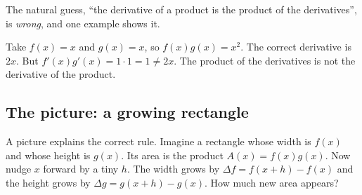 The natural guess, ``the derivative of a product is the product of the derivatives'',
is \emph{wrong}, and one example shows it.

\begin{trapbox}
Take $f(x)=x$ and $g(x)=x$, so $f(x)g(x)=x^2$. The correct derivative is $2x$. But
$f'(x)g'(x) = 1\cdot 1 = 1 \ne 2x$. The product of the derivatives is not the derivative
of the product.
\end{trapbox}

\subsection{The picture: a growing rectangle}

A picture explains the correct rule. Imagine a rectangle whose width is
$f(x)$ and whose height is $g(x)$. Its area is the product $A(x)=f(x)g(x)$. Now nudge $x$
forward by a tiny $h$. The width grows by $\Delta f = f(x+h)-f(x)$ and the height grows by
$\Delta g = g(x+h)-g(x)$. How much new area appears?

